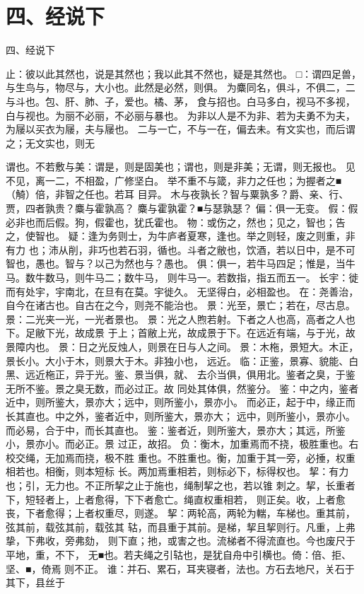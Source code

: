 \documentclass[12pt,UTF8]{ctexbook}
\begin{document}
\chapter{四、经说下}

四、经说下

止：彼以此其然也，说是其然也；我以此其不然也，疑是其然也。 
□：谓四足兽，与生鸟与，物尽与，大小也。此然是必然，则俱。 
为麋同名，俱斗，不俱二，二与斗也。包、肝、肺、子，爱也。橘、茅， 
食与招也。白马多白，视马不多视，白与视也。为丽不必丽，不必丽与暴也。 
为非以人是不为非、若为夫勇不为夫，为屦以买衣为屦，夫与屦也。 
二与一亡，不与一在，偏去未。有文实也，而后谓之；无文实也，则无 

谓也。不若敷与美：谓是，则是固美也；谓也，则是非美；无谓，则无报也。 
见不见，离一二，不相盈，广修坚白。 
举不重不与箴，非力之任也；为握者之■（觭）倍，非智之任也。若耳 
目异。 
木与夜孰长？智与粟孰多？爵、亲、行、贾，四者孰贵？麋与霍孰高？ 
麋与霍孰霍？■与瑟孰瑟？ 
偏：俱一无变。 
假：假必非也而后假。狗，假霍也，犹氏霍也。 
物：或伤之，然也；见之，智也；告之，使智也。 
疑：逢为务则士，为牛庐者夏寒，逢也。举之则轻，废之则重，非有力 
也；沛从削，非巧也若石羽，循也。斗者之敝也，饮酒，若以日中，是不可 
智也，愚也。智与？以己为然也与？愚也。 
俱：俱一，若牛马四足；惟是，当牛马。数牛数马，则牛马二；数牛马， 
则牛马一。若数指，指五而五一。 
长宇：徙而有处宇，宇南北，在旦有在莫。宇徙久。 
无坚得白，必相盈也。 
在：尧善治，自今在诸古也。自古在之今，则尧不能治也。 
景：光至，景亡；若在，尽古息。 
景：二光夹一光，一光者景也。 
景：光之人煦若射。下者之人也高，高者之人也下。足敝下光，故成景 
于上；首敝上光，故成景于下。在远近有端，与于光，故景障内也。 
景：日之光反烛人，则景在日与人之间。 
景：木柂，景短大。木正，景长小。大小于木，则景大于木。非独小也， 
远近。 
临：正鉴，景寡、貌能、白黑、远近柂正，异于光。鉴、景当俱，就、 
去尒当俱，俱用北。鉴者之臭，于鉴无所不鉴。景之臭无数，而必过正。故 
同处其体俱，然鉴分。 
鉴：中之内，鉴者近中，则所鉴大，景亦大；远中，则所鉴小，景亦小。 
而必正，起于中，缘正而长其直也。中之外，鉴者近中，则所鉴大，景亦大； 
远中，则所鉴小，景亦小。而必易，合于中，而长其直也。 
鉴：鉴者近，则所鉴大，景亦大；其远，所鉴小，景亦小。而必正。景 
过正，故招。 
负：衡木，加重焉而不挠，极胜重也。右校交绳，无加焉而挠，极不胜 
重也。不胜重也。衡，加重于其一旁，必捶，权重相若也。相衡，则本短标 
长。两加焉重相若，则标必下，标得权也。 
挈：有力也；引，无力也。不正所挈之止于施也，绳制挈之也，若以锥 
刺之。挈，长重者下，短轻者上，上者愈得，下下者愈亡。绳直权重相若， 
则正矣。收，上者愈丧，下者愈得；上者权重尽，则遂。 
挈：两轮高，两轮为輲，车梯也。重其前，弦其前，载弦其前，载弦其 
轱，而县重于其前。是梯，挈且挈则行。凡重，上弗挚，下弗收，旁弗劾， 
则下直；扡，或害之也。流梯者不得流直也。今也废尺于平地，重，不下， 
无■也。若夫绳之引轱也，是犹自舟中引横也。倚：倍、拒、坚、■，倚焉 
则不正。 
谁：并石、累石，耳夹寝者，法也。方石去地尺，关石于其下，县丝于 
\end{document}
